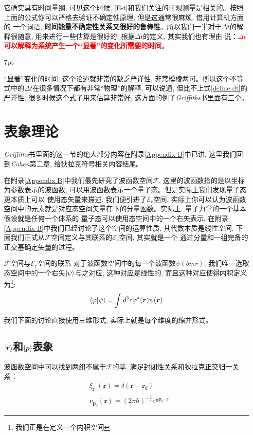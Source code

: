\documentclass[a4paper,zihao=-4,linespread=1]{ctexrep}
\newenvironment{thinknote}{%
\def\FrameCommand{%
\hspace{1pt}%
{\color{BurlyWood}\vrule width 2pt}%
{\color{formalshade}\vrule width 4pt}%
\colorbox{formalshade}%
}%
\MakeFramed{\advance\hsize-\width\FrameRestore}%
\noindent\hspace{-4.55pt}%
\begin{adjustwidth}{}{7pt}%
\vspace{2pt}\vspace{2pt}%
}
{%
\vspace{2pt}\end{adjustwidth}\endMakeFramed%
}
\begin{document}
    它确实具有时间量纲, 可见这个时候, \ref{E-t}和我们关注的可观测量是相关的。按照上面的公式你可以严格去验证不确定性原理, 但是这通常很麻烦, 借用计算机方面的
    一个词语, \textbf{时间能量不确定性关系又很好的鲁棒性}。所以我们一半对于$\Delta t$的解释很随意, 用来进行一些估算是很好的, 根据$\Delta t$的定义, 其实我们也有理由
    说：\textbf{\textcolor{red}{$\Delta t$可以解释为系统产生一个“显著”的变化所需要的时间}}。
    \begin{thinknote}
        “显著”变化的时间, 这个论述就非常的缺乏严谨性, 非常模棱两可。所以这个不等式中的$\Delta t$在很多情况下都有非常“物理”的解释, 可以说通, 但比不上式\ref{define dt}的
        严谨性, 很多时候这个式子用来估算非常好, 这方面的例子{\itshape Griffiths}书里面有三个。
    \end{thinknote}
    \section{表象理论}
    {\itshape Griffiths}书里面的这一节的绝大部分内容在附录\ref{Appendix B}中已讲, 这里我们回到{\itshape Cohen}第二章, 给狄拉克符号相关内容结尾。
    
    在附录\ref{Appendix B}中我们最先研究了波函数空间$\mathscr{F}$, 这里的波函数指的是以坐标为参数表示的波函数, 可以用波函数表示一个量子态。但是实际上我们发现量子态更本质上可以
    使用态矢量来描述, 我们便引进了$\mathscr{E}_r$空间, 实际上你可以认为波函数空间中的元素就是对应态空间矢量在下的分量函数。实际上, 量子力学的一个基本假设就是任何一个体系的
    量子态可以使用态空间中的一个右矢表示, 在附录\ref{Appendix B}中我们已经讨论了这个空间的运算性质, 其代数本质是线性空间, 下面我们正式从$\mathscr{F}$空间定义与其联系的$\mathscr {E}_r$空间, 其实就是一个
    通过分量和一组完备的正交基确定矢量的过程。
    \begin{proposition}{$\mathscr{F}$空间与$\mathscr {E}_r$空间的联系}
        对于波函数空间中的每一个波函数$\psi(bm{r})$, 我们唯一选取态空间中的一个右矢$\ket{\psi}$与之对应, 这种对应是线性的, 而且这种对应使得内积定义为\footnote{我们正是在定义一个内积空间}:
        \begin{equation}
            \label{eq:3.30}
            \braket{\varphi|\psi}=\int d^3r\varphi^*(\bm{r})\psi(\bm{r})
        \end{equation}
    \end{proposition}
    我们下面的讨论直接使用三维形式, 实际上就是每个维度的缩并形式。
    \subsection*{$\ket{\bm{r}}$和$\ket{\bm{p}}$表象}
    波函数空间中可以找到两组不属于$\mathscr{F}$的基, 满足封闭性关系和狄拉克正交归一关系：
    \begin{align}
        \label{eq:3.31}& \xi_{\bm{r}_0}(\bm{r})=\delta({\bm{r}-\bm{r}_0})\\
        \label{eq:3.32}& \nu_{\bm{p}_0}(\bm{r})=\left(2\pi\hbar\right)^{-\frac{3}{2}}e^{\frac{i}{\hbar}\bm{p}_0\cdot\bm{r}}
    \end{align}
    
\end{document}

